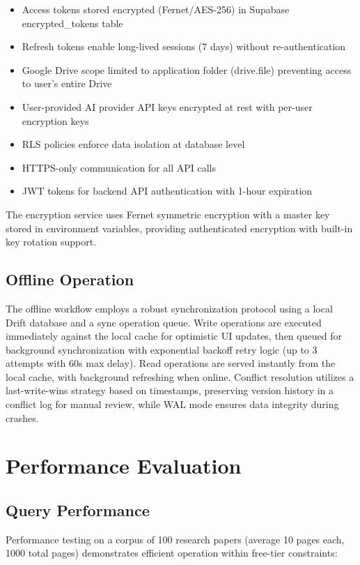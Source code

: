 \documentclass[conference]{IEEEtran}
\begin{document}
\begin{itemize}
\item Access tokens stored encrypted (Fernet/AES-256) in Supabase encrypted\_tokens table
\item Refresh tokens enable long-lived sessions (7 days) without re-authentication
\item Google Drive scope limited to application folder (drive.file) preventing access to user's entire Drive
\item User-provided AI provider API keys encrypted at rest with per-user encryption keys
\item RLS policies enforce data isolation at database level
\item HTTPS-only communication for all API calls
\item JWT tokens for backend API authentication with 1-hour expiration
\end{itemize}

The encryption service uses Fernet symmetric encryption with a master key stored in environment variables, providing authenticated encryption with built-in key rotation support.


\subsection{Offline Operation}
The offline workflow employs a robust synchronization protocol using a local Drift database and a sync operation queue. Write operations are executed immediately against the local cache for optimistic UI updates, then queued for background synchronization with exponential backoff retry logic (up to 3 attempts with 60s max delay). Read operations are served instantly from the local cache, with background refreshing when online. Conflict resolution utilizes a last-write-wins strategy based on timestamps, preserving version history in a conflict log for manual review, while WAL mode ensures data integrity during crashes.


\section{Performance Evaluation}

\subsection{Query Performance}

Performance testing on a corpus of 100 research papers (average 10 pages each, 1000 total pages) demonstrates efficient operation within free-tier constraints:
\end{document}
